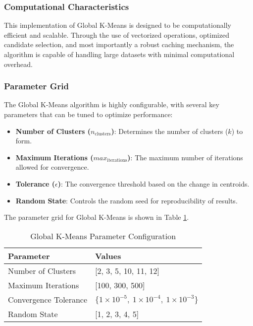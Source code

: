\subsubsection*{Computational Characteristics}
This implementation of Global K-Means is designed to be computationally efficient and scalable. 
Through the use of vectorized operations, optimized candidate selection, and most importantly a robust caching mechanism,
the algorithm is capable of handling large datasets with minimal computational overhead.


\subsubsection*{Parameter Grid}

The Global K-Means algorithm is highly configurable, with several key parameters that can be tuned to optimize performance:

\begin{itemize}
    \item \textbf{Number of Clusters (\(n_{\text{clusters}}\))}: Determines the number of clusters (\(k\)) to form.
    \item \textbf{Maximum Iterations (\(max_{\text{iterations}}\))}: The maximum number of iterations allowed for convergence.
    \item \textbf{Tolerance (\(\epsilon\))}: The convergence threshold based on the change in centroids.
    \item \textbf{Random State}: Controls the random seed for reproducibility of results.
\end{itemize}

The parameter grid for Global K-Means is shown in Table \ref{tab:globalkmeansparams}.

\begin{table}[h!]
\centering
\caption{Global K-Means Parameter Configuration}
\label{tab:globalkmeansparams}
\begin{tabularx}{\columnwidth}{|X|X|}
\hline
\textbf{Parameter} & \textbf{Values}\\ \hline
Number of Clusters & [2, 3, 5, 10, 11, 12] \\ \hline
Maximum Iterations & [100, 300, 500] \\ \hline
Convergence Tolerance & $\{1 \times 10^{-5},\ 1 \times 10^{-4},\ 1 \times 10^{-3}\}$ \\ \hline
Random State & [1, 2, 3, 4, 5] \\ \hline
\end{tabularx}
\end{table}
